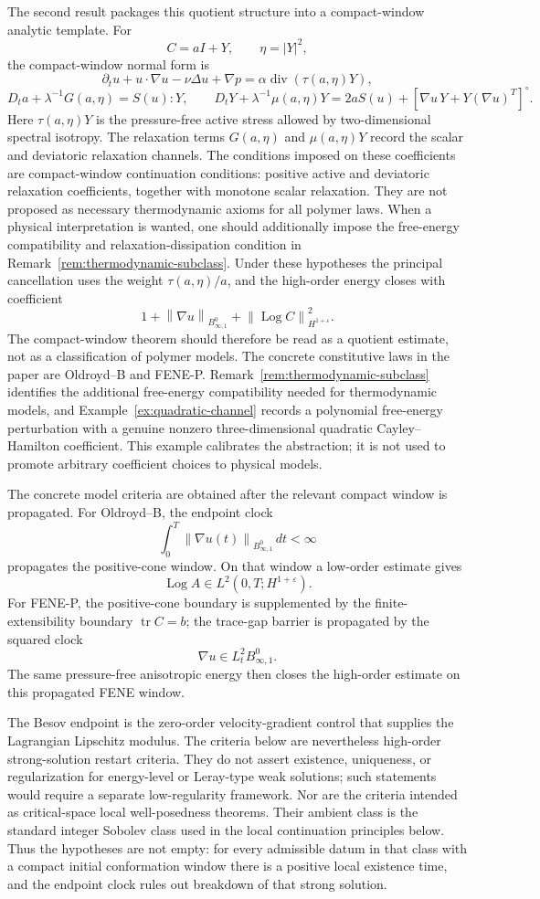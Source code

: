 \documentclass[11pt]{article}
\newcommand{\tr}{\operatorname{tr}}
\newcommand{\divv}{\operatorname{div}}
\newcommand{\Log}{\operatorname{Log}}
\newcommand{\eps}{\varepsilon}
\newcommand{\norm}[1]{\left\lVert #1\right\rVert}
\begin{document}
The second result packages this quotient structure into a compact-window analytic template.
For
\[
  C=aI+Y,\qquad \eta=|Y|^2,
\]
the compact-window normal form is
\[
  \partial_tu+u\cdot\nabla u-\nu\Delta u+\nabla p
  =\alpha\divv(\tau(a,\eta)Y),
\]
\[
  D_ta+\lambda^{-1}G(a,\eta)=S(u):Y,\qquad
  D_tY+\lambda^{-1}\mu(a,\eta)Y
  =2aS(u)+[\nabla u\,Y+Y(\nabla u)^T]^\circ .
\]
Here \(\tau(a,\eta)Y\) is the pressure-free active stress allowed by
two-dimensional spectral isotropy.  The relaxation terms \(G(a,\eta)\) and
\(\mu(a,\eta)Y\) record the scalar and deviatoric relaxation channels.  The
conditions imposed on these coefficients are compact-window continuation
conditions: positive active and deviatoric relaxation coefficients, together
with monotone scalar relaxation.  They are not proposed as necessary
thermodynamic axioms for all polymer laws.  When a physical interpretation is
wanted, one should additionally impose the free-energy compatibility and
relaxation-dissipation condition in Remark~\ref{rem:thermodynamic-subclass}.
Under these hypotheses the principal cancellation uses the weight
\(\tau(a,\eta)/a\), and the high-order energy closes with coefficient
\[
  1+\norm{\nabla u}_{B^0_{\infty,1}}
  +\norm{\Log C}_{H^{1+\eps}}^2 .
\]
The compact-window theorem should therefore be read as a quotient estimate, not
as a classification of polymer models.  The concrete constitutive laws in the
paper are Oldroyd--B and FENE-P.  Remark~\ref{rem:thermodynamic-subclass}
identifies the additional free-energy compatibility needed for thermodynamic
models, and Example~\ref{ex:quadratic-channel} records a polynomial
free-energy perturbation with a genuine nonzero three-dimensional quadratic
Cayley--Hamilton coefficient.  This example calibrates the abstraction; it is
not used to promote arbitrary coefficient choices to physical models.

The concrete model criteria are obtained after the relevant compact window is
propagated.  For Oldroyd--B, the endpoint clock
\[
  \int_0^T\norm{\nabla u(t)}_{B^0_{\infty,1}}\,dt<\infty
\]
propagates the positive-cone window.  On that window a low-order estimate gives
\[
  \Log A\in L^2(0,T;H^{1+\varepsilon}).
\]
For FENE-P, the positive-cone boundary is supplemented by the
finite-extensibility boundary \(\tr C=b\); the trace-gap barrier is propagated
by the squared clock
\[
  \nabla u\in L^2_tB^0_{\infty,1}.
\]
The same pressure-free anisotropic energy then closes the high-order estimate on
this propagated FENE window.

The Besov endpoint is the zero-order velocity-gradient control that supplies the
Lagrangian Lipschitz modulus.  The criteria below are nevertheless high-order
strong-solution restart criteria.  They do not assert existence, uniqueness, or
regularization for energy-level or Leray-type weak solutions; such statements
would require a separate low-regularity framework.  Nor are the criteria
intended as critical-space local well-posedness theorems.  Their ambient class is
the standard integer Sobolev class used in the local continuation principles
below.  Thus the hypotheses are not empty: for every admissible datum in that
class with a compact initial conformation window there is a positive local
existence time, and the endpoint clock rules out breakdown of that strong
solution.
\end{document}
